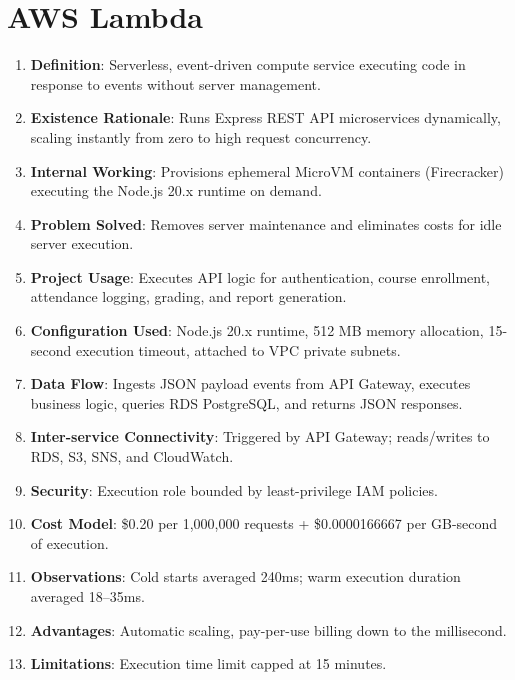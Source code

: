 \section{AWS Lambda}
\begin{enumerate}
    \item \textbf{Definition}: Serverless, event-driven compute service executing code in response to events without server management.
    \item \textbf{Existence Rationale}: Runs Express REST API microservices dynamically, scaling instantly from zero to high request concurrency.
    \item \textbf{Internal Working}: Provisions ephemeral MicroVM containers (Firecracker) executing the Node.js 20.x runtime on demand.
    \item \textbf{Problem Solved}: Removes server maintenance and eliminates costs for idle server execution.
    \item \textbf{Project Usage}: Executes API logic for authentication, course enrollment, attendance logging, grading, and report generation.
    \item \textbf{Configuration Used}: Node.js 20.x runtime, 512 MB memory allocation, 15-second execution timeout, attached to VPC private subnets.
    \item \textbf{Data Flow}: Ingests JSON payload events from API Gateway, executes business logic, queries RDS PostgreSQL, and returns JSON responses.
    \item \textbf{Inter-service Connectivity}: Triggered by API Gateway; reads/writes to RDS, S3, SNS, and CloudWatch.
    \item \textbf{Security}: Execution role bounded by least-privilege IAM policies.
    \item \textbf{Cost Model}: \$0.20 per 1,000,000 requests + \$0.0000166667 per GB-second of execution.
    \item \textbf{Observations}: Cold starts averaged 240ms; warm execution duration averaged 18–35ms.
    \item \textbf{Advantages}: Automatic scaling, pay-per-use billing down to the millisecond.
    \item \textbf{Limitations}: Execution time limit capped at 15 minutes.
\end{enumerate}

